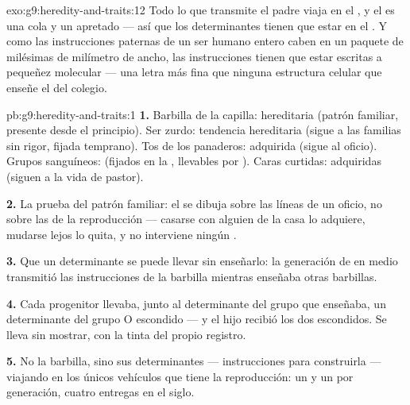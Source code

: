 \begin{solution}{exo:g9:heredity-and-traits:12}
Todo lo que transmite el padre viaja en el , y el
 es una cola y un  apretado --- así que los
determinantes tienen que estar en el . Y como las instrucciones
paternas de un ser humano entero caben en un paquete de milésimas de
milímetro de ancho, las instrucciones tienen que estar escritas a
pequeñez molecular --- una letra más fina que ninguna estructura
celular que enseñe el  del colegio.
\end{solution}

\begin{solution}{pb:g9:heredity-and-traits:1}
\textbf{1.} Barbilla de la capilla: hereditaria (patrón familiar,
presente desde el principio). Ser zurdo: tendencia hereditaria (sigue a
las familias sin rigor, fijada temprano). Tos de los panaderos:
adquirida (sigue al oficio). Grupos sanguíneos:  (fijados
en la , llevables por ). Caras curtidas: adquiridas
(siguen a la vida de pastor).

\textbf{2.} La prueba del patrón familiar: el  se dibuja sobre las
líneas de un oficio, no sobre las de la reproducción --- casarse con
alguien de la casa lo adquiere, mudarse lejos lo quita, y no interviene
ningún .

\textbf{3.} Que un determinante se puede llevar sin enseñarlo: la
generación de en medio transmitió las instrucciones de la barbilla
mientras enseñaba otras barbillas.

\textbf{4.} Cada progenitor llevaba, junto al determinante del grupo
que enseñaba, un determinante del grupo O escondido --- y el hijo
recibió los dos escondidos. Se lleva sin mostrar, con la tinta del
propio registro.

\textbf{5.} No la barbilla, sino sus determinantes --- instrucciones
para construirla --- viajando en los únicos vehículos que tiene la
reproducción: un  y un  por generación, cuatro
entregas en el siglo.


\end{solution}
